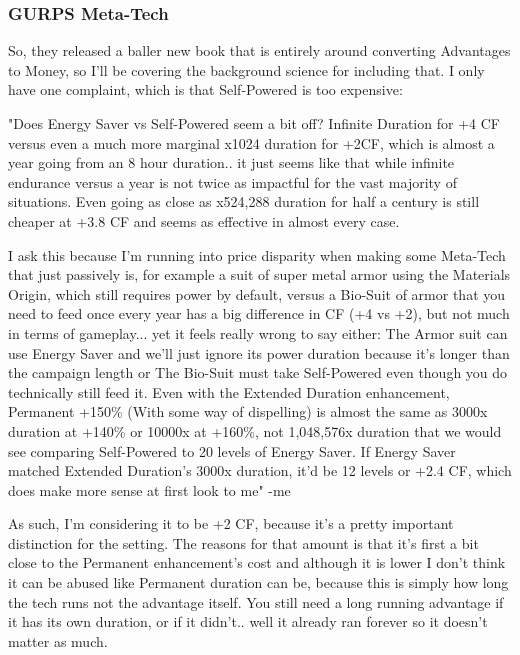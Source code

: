 	\subsubsection{GURPS Meta-Tech}
	
	So, they released a baller new book that is entirely around converting Advantages to Money, so I'll be covering the background science for including that. I only have one complaint, which is that Self-Powered is too expensive:
	
	"Does Energy Saver vs Self-Powered seem a bit off? Infinite Duration for +4 CF versus even a much more marginal x1024 duration for +2CF, which is almost a year going from an 8 hour duration.. it just seems like that while infinite endurance versus a year is not twice as impactful for the vast majority of situations. Even going as close as x524,288 duration for half a century is still cheaper at +3.8 CF and seems as effective in almost every case.
	
	I ask this because I'm running into price disparity when making some Meta-Tech that just passively is, for example a suit of super metal armor using the Materials Origin, which still requires power by default, versus a Bio-Suit of armor that you need to feed once every year has a big difference in CF (+4 vs +2), but not much in terms of gameplay... yet it feels really wrong to say either: The Armor suit can use Energy Saver and we'll just ignore its power duration because it's longer than the campaign length or The Bio-Suit must take Self-Powered even though you do technically still feed it. 
	Even with the Extended Duration enhancement, Permanent +150\% (With some way of dispelling) is almost the same as 3000x duration at +140\% or 10000x at +160\%, not 1,048,576x duration that we would see comparing Self-Powered to 20 levels of Energy Saver. If Energy Saver matched Extended Duration's 3000x duration, it'd be 12 levels or +2.4 CF, which does make more sense at first look to me" -me
	
	As such, I'm considering it to be +2 CF, because it's a pretty important distinction for the setting. The reasons for that amount is that it's first a bit close to the Permanent enhancement's cost and although it is lower I don't think it can be abused like Permanent duration can be, because this is simply how long the tech runs not the advantage itself. You still need a long running advantage if it has its own duration, or if it didn't.. well it already ran forever so it doesn't matter as much.
	
